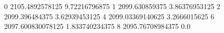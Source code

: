 0 2105.4892578125 9.72216796875
1 2099.630859375 3.86376953125
2 2099.396484375 3.62939453125
4 2099.03369140625 3.2666015625
6 2097.600830078125 1.833740234375
8 2095.76708984375 0.0
